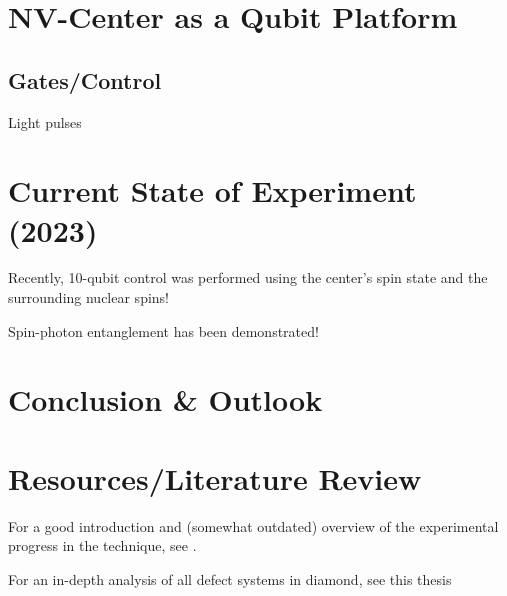 \documentclass[10pt,a4paper]{article}
\begin{document}
\begin{multicols}{2}
\section{NV-Center as a Qubit Platform}

\subsection{Gates/Control}
Light pulses


\section{Current State of Experiment (2023)}
Recently, 10-qubit control was performed using the center's spin state and the surrounding nuclear spins!

Spin-photon entanglement has been demonstrated!

\section{Conclusion \& Outlook}

\section{Resources/Literature Review}
For a good introduction and (somewhat outdated) overview of the experimental progress in the technique, see
\cite{childress2013diamond}.

For an in-depth analysis of all defect systems in diamond, see this thesis %
\end{multicols}



 
\end{document}
